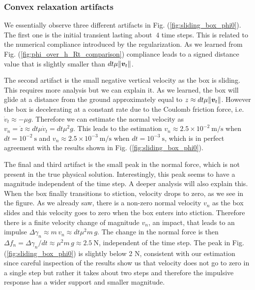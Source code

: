 \subsubsection{Convex relaxation artifacts}

We essentially observe three different artifacts in Fig.
(\ref{fig:sliding_box_phi0}). The first one is the initial transient lasting
about $~4$ time steps. This is related to the numerical compliance introduced by
the regularization. As we learned from Fig. (\ref{fig:phi_over_h_Rt_comparison})
compliance leads to a signed distance value that is slightly smaller than
$dt\mu\Vert{\bm{v}}_t\Vert$. 

The second artifact is the small negative vertical velocity as the box is
sliding. This requires more analysis but we can explain it. As we learned, the
box will glide at a distance from the ground approximately equal to $z\approx
dt\mu\Vert{\bm{v}}_t\Vert$. However the box is decelerating at a constant rate due
to the Coulomb friction force, i.e. $\dot{v}_t\approx -\mu g$. Therefore we can
estimate the normal velocity as $v_n=\dot{z}\approx dt\mu \dot{v}_t=dt\mu^2g$.
This leads to the estimation $v_n\approx 2.5\times 10^{-2}~\text{m}/\text{s}$
when $dt=10^{-2}~\text{s}$ and $v_n\approx 2.5\times 10^{-3}~\text{m}/\text{s}$
when $dt=10^{-3}~\text{s}$, which is in perfect agreement with the results shown
in Fig. (\ref{fig:sliding_box_phi0}).

The final and third artifact is the small peak in the normal force, which is not
present in the true physical solution. Interestingly, this peak seems to have a
magnitude independent of the time step. A deeper analysis will also explain
this. When the box finally transitions to stiction, velocity drops to zero, as
we see in the figure. As we already saw, there is a non-zero normal velocity
$v_n$ as the box slides and this velocity goes to zero when the box enters into
stiction. Therefore there is a finite velocity change of magnitude $v_n$, an
impact, that leads to an impulse $\Delta\gamma_n\approx m\,v_n\approx
dt\mu^2m\,g$. The change in the normal force is then $\Delta
f_n=\Delta\gamma_n/dt\approx \mu^2m\,g \approx 2.5~\text{N}$, independent of the
time step. The peak in Fig. (\ref{fig:sliding_box_phi0}) is slightly below 2 N,
consistent with our estimation since careful inspection of the results show us
that velocity does not go to zero in a single step but rather it takes about two
steps and therefore the impulsive response has a wider support and smaller
magnitude.

